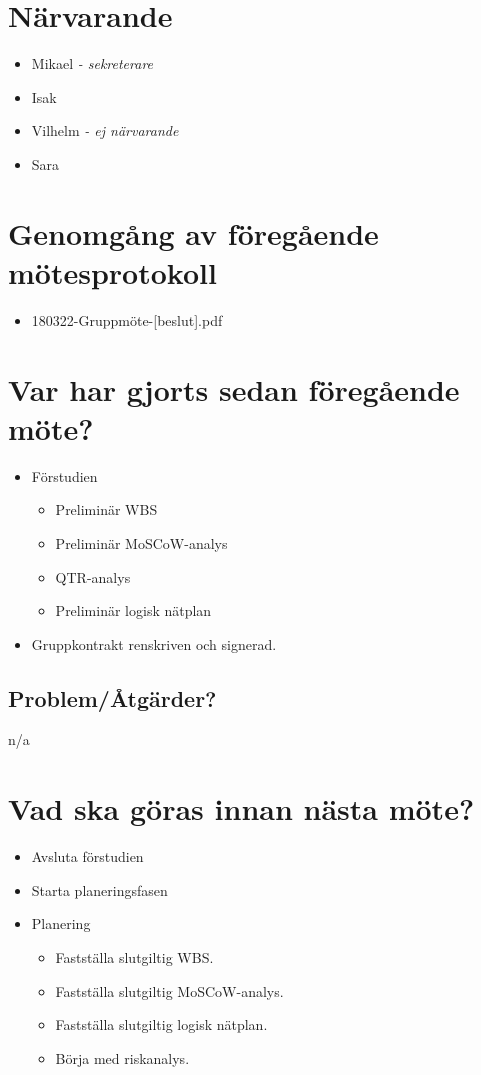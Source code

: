 
\section*{Närvarande}
\begin{itemize}[noitemsep]
    \item Mikael \textit{- sekreterare}
    \item Isak
    \item Vilhelm \textit{- ej närvarande}
    \item Sara
\end{itemize}

\section*{Genomgång av föregående mötesprotokoll}
\begin{itemize}[noitemsep]
    \item 180322-Gruppmöte-[beslut].pdf
\end{itemize}


\section*{Var har gjorts sedan föregående möte?}
\begin{itemize}[noitemsep]
    \item Förstudien
    \begin{itemize}[noitemsep]
        \item Preliminär WBS
        \item Preliminär MoSCoW-analys
        \item QTR-analys
        \item Preliminär logisk nätplan
    \end{itemize}
    \item Gruppkontrakt renskriven och signerad.
\end{itemize}

\subsection*{Problem/Åtgärder?}
n/a

\section*{Vad ska göras innan nästa möte?}
\begin{itemize}[noitemsep]
    \item Avsluta förstudien
    \item Starta planeringsfasen
    \item Planering
    \begin{itemize}[noitemsep]
        \item Fastställa slutgiltig WBS.
        \item Fastställa slutgiltig MoSCoW-analys.
        \item Fastställa slutgiltig logisk nätplan.
        \item Börja med riskanalys.
    \end{itemize}
\end{itemize}

